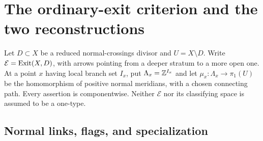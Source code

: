 \section{The ordinary-exit criterion and the two reconstructions}
\label{sec:criterion}
Let $D\subset X$ be a reduced normal-crossings divisor and $U=X\setminus D$.
Write $\mathcal E=\operatorname{Exit}(X,D)$, with arrows pointing from a deeper stratum
to a more open one. At a point $x$ having local branch set $I_x$, put
$\Lambda_x=\mathbb Z^{I_x}$ and let $\mu_x:\Lambda_x\to\pi_1(U)$ be the
homomorphism of positive normal meridians, with a chosen connecting path.
Every assertion is componentwise. Neither $\mathcal E$ nor its classifying
space is assumed to be a one-type.

\subsection{Normal links, flags, and specialization}

